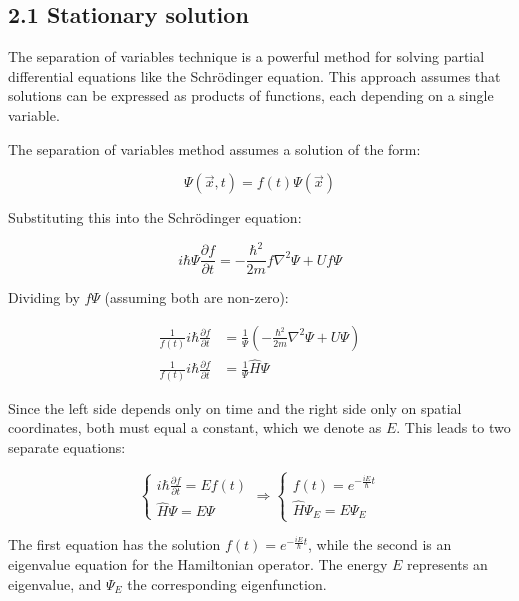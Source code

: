 \documentclass[italian]{HKNdocument}
\begin{document}
\subsection*{2.1 Stationary solution}

The separation of variables technique is a powerful method for solving partial differential equations like the Schrödinger equation. This approach assumes that solutions can be expressed as products of functions, each depending on a single variable.


The separation of variables method assumes a solution of the form:

\begin{equation*}
\Psi(\vec{x}, t) = f(t)\Psi(\vec{x}) \tag{2.1}
\end{equation*}

Substituting this into the Schrödinger equation:

\begin{equation*}
i\hbar\Psi\frac{\partial f}{\partial t} = -\frac{\hbar^2}{2m}f\nabla^2\Psi + Uf\Psi \tag{2.2}
\end{equation*}

Dividing by $f\Psi$ (assuming both are non-zero):

\begin{align*}
\frac{1}{f(t)}i\hbar\frac{\partial f}{\partial t} &= \frac{1}{\Psi}\left(-\frac{\hbar^2}{2m}\nabla^2\Psi + U\Psi\right) \\
\frac{1}{f(t)}i\hbar\frac{\partial f}{\partial t} &= \frac{1}{\Psi}\hat{H}\Psi \tag{2.3}
\end{align*}

Since the left side depends only on time and the right side only on spatial coordinates, both must equal a constant, which we denote as $E$. This leads to two separate equations:

\[
\left\{\begin{array}{l}
i\hbar\frac{\partial f}{\partial t} = Ef(t) \\
\hat{H}\Psi = E\Psi
\end{array}\right. \Rightarrow \left\{\begin{array}{l}
f(t) = e^{-\frac{iE}{\hbar}t} \\
\hat{H}\Psi_E = E\Psi_E
\end{array}\right. \tag{2.4}
\]

The first equation has the solution $f(t) = e^{-\frac{iE}{\hbar}t}$, while the second is an eigenvalue equation for the Hamiltonian operator. The energy $E$ represents an eigenvalue, and $\Psi_E$ the corresponding eigenfunction.
\end{document}
